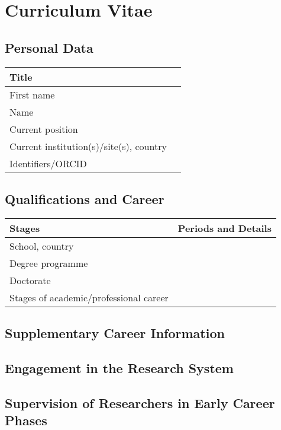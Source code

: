 \documentclass{scrartcl}
\begin{document}
\section*{Curriculum Vitae}

\subsection*{Personal Data}

\begin{tabular}{|>{\raggedright}p{}|p{}|}
\hline
Title & \\
\hline
First name & \\
\hline
Name & \\
\hline
Current position &  \\
\hline
Current institution(s)/site(s), country & \\
\hline
Identifiers/ORCID & \\
\hline
\end{tabular}

\subsection*{Qualifications and Career}

\begin{tabular}{|>{\raggedright}p{}|p{}|}
\hline
\textbf{Stages} & \textbf{Periods and Details} \\
\hline
School, country & \\ %
\hline
Degree programme & \\
\hline
Doctorate & \\
\hline
Stages of academic/professional career & \\ %
\hline
\end{tabular}

\subsection*{Supplementary Career Information}

\subsection*{Engagement in the Research System}

\subsection*{Supervision of Researchers in Early Career Phases}
\end{document}
